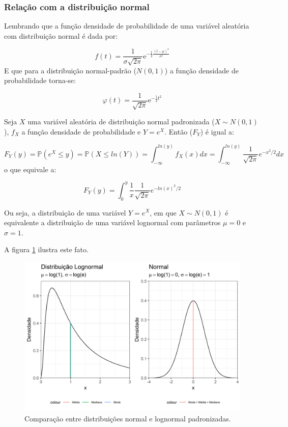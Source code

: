 \documentclass[a4paper]{article}
\begin{document}
\begin{center}\end{center}

\subsubsection{Relação com a distribuição
normal}\label{relacao-com-a-distribuicao-normal}

Lembrando que a função densidade de probabilidade de uma variável
aleatória com distribuição normal é dada por:

\[f(t) = \frac{1}{\sigma\sqrt{2\pi}}\mathrm{e}^{-\frac{1}{2}\frac{(t-\mu)^2}{\sigma^2}}\]
E que para a distribuição normal-padrão (\(N(0,1)\)) a função densidade
de probabilidade torna-se:

\[\varphi(t) = \frac{1}{\sqrt{2\pi}}\mathrm{e}^{-\frac{1}{2}t^2}\]

Seja \(X\) uma variável aleatória de distribuição normal padronizada
(\(X \sim N(0, 1)\)), \(f_X\) a função densidade de probabilidade e
\(Y = e^X\). Então (\(F_Y\)) é igual a:

\[F_Y(y) = \mathbb{P}(e^X\leq y) = \mathbb{P}(X \leq ln(Y)) = \int_{-\infty}^{ln(y)}f_X(x)dx = \int_{-\infty}^{ln(y)}\frac{1}{\sqrt{2\pi}}e^{-x^2/2}dx\]
o que equivale a:

\[F_Y(y) = \int_{0}^{y}\frac{1}{x}\frac{1}{\sqrt{2\pi}}e^{-ln(x)^2/2}\]

Ou seja, a distribuição de uma variável \(Y = e^X\), em que
\(X \sim N(0,1)\) é equivalente a distribuição de uma variável lognormal
com parâmetros \(\mu = 0\) e \(\sigma = 1\).

A figura \ref{fig:normal_lognormal} ilustra este fato.

\begin{figure}[H]

{\centering \includegraphics[width=1\linewidth]{images/normal_lognormal-1} 

}

\caption{Comparação entre distribuições normal e lognormal padronizadas.}\label{fig:normal_lognormal}
\end{figure}
\end{document}
